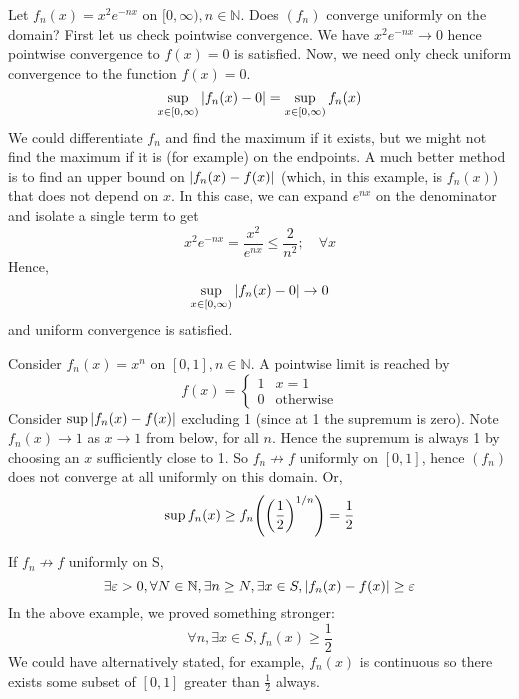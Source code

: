 \begin{example}
	Let \( f_n(x) = x^2 e^{-nx} \) on \( [0, \infty), n \in \mathbb N \).
	Does \( (f_n) \) converge uniformly on the domain?
	First let us check pointwise convergence.
	We have \( x^2 e^{-nx} \to 0 \) hence pointwise convergence to \( f(x) = 0 \) is satisfied.
	Now, we need only check uniform convergence to the function \( f(x) = 0 \).
	\[
		\sup_{x \in [0, \infty)} \abs{f_n(x) - 0} = \sup_{x \in [0, \infty)} f_n(x)
	\]
	We could differentiate \( f_n \) and find the maximum if it exists, but we might not find the maximum if it is (for example) on the endpoints.
	A much better method is to find an upper bound on \( \abs{f_n(x)-f(x)} \) (which, in this example, is \( f_n(x) \)) that does not depend on \( x \).
	In this case, we can expand \( e^{nx} \) on the denominator and isolate a single term to get
	\[
		x^2 e^{-nx} = \frac{x^2}{e^{nx}} \leq \frac{2}{n^2};\quad \forall x
	\]
	Hence,
	\[
		\sup_{x \in [0, \infty)} \abs{f_n(x) - 0} \to 0
	\]
	and uniform convergence is satisfied.
\end{example}
\begin{example}
	Consider \( f_n(x) = x^n \) on \( [0,1], n \in \mathbb N \).
	A pointwise limit is reached by
	\[
		f(x) = \begin{cases}
			1 & x = 1            \\
			0 & \text{otherwise}
		\end{cases}
	\]
	Consider \( \sup \abs{f_n(x) - f(x)} \) excluding 1 (since at 1 the supremum is zero).
	Note \( f_n(x) \to 1 \) as \( x \to 1 \) from below, for all \( n \).
	Hence the supremum is always 1 by choosing an \( x \) sufficiently close to 1.
	So \( f_n \not\to f \) uniformly on \( [0,1] \), hence \( (f_n) \) does not converge at all uniformly on this domain.
	Or,
	\[
		\sup f_n(x) \geq f_n\qty(\qty(\frac{1}{2})^{1/n}) = \frac{1}{2}
	\]
\end{example}

\begin{remark}
	If \(f_n \not\to f\) uniformly on S,
	\[
		\exists \varepsilon > 0, \forall N \in \mathbb N, \exists n \geq N, \exists x \in S, \abs{f_n(x) - f(x)} \geq \varepsilon
	\]
	In the above example, we proved something stronger:
	\[
		\forall n, \exists x \in S, f_n(x) \geq \frac{1}{2}
	\]
	We could have alternatively stated, for example, \( f_n(x) \) is continuous so there exists some subset of \( [0, 1] \) greater than \( \frac{1}{2} \) always.
\end{remark}

